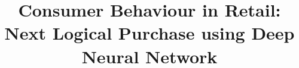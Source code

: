 \documentclass[letterpaper]{article} %
\title{Consumer Behaviour in Retail: Next Logical Purchase using Deep Neural Network}
\author{

}
\begin{document}
\linenumbers
\maketitle








%

\end{document}
